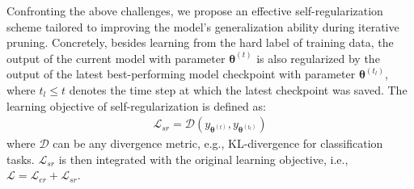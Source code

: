 Confronting the above challenges, we propose an effective self-regularization scheme tailored to improving the model's generalization ability during iterative pruning. Concretely, besides learning from the hard label of training data, the output of the current model with parameter $\bm{\theta}^{(t)}$ is also regularized by the output of the latest best-performing model checkpoint with parameter $\bm{\theta}^{(t_l)}$, where $t_l\leq t$ denotes the time step at which the latest checkpoint was saved. The learning objective of self-regularization is defined as:
\begin{align}
	\mathcal{L}_{sr}=\mathcal{D}(y_{\bm{\theta}^{(t)}},y_{\bm{\theta}^{(t_l)}})
\end{align}
where $\mathcal{D}$ can be any divergence metric, e.g., KL-divergence for classification tasks. $\mathcal{L}_{sr}$ is then integrated with the original learning objective, i.e., $\mathcal{L}=\mathcal{L}_{er}+\mathcal{L}_{sr}$.
